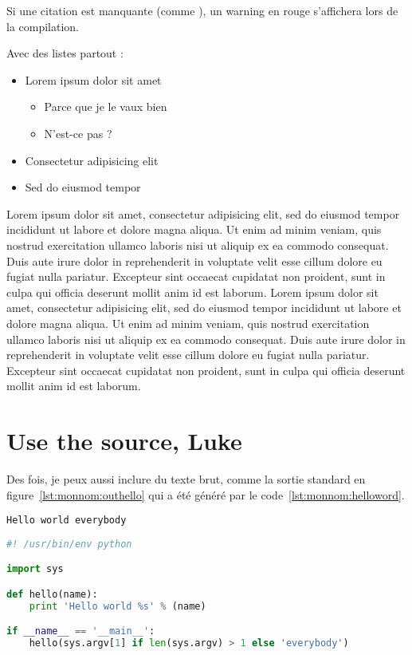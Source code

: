 Si une citation est manquante (comme \cite{monnom:referencefoireuse}),
un warning en rouge s'affichera lors de la compilation.



Avec des listes partout :
\begin{itemize}
\item Lorem ipsum dolor sit amet
  \begin{itemize}
  \item Parce que je le vaux bien
  \item N'est-ce pas ?
  \end{itemize}
\item Consectetur adipisicing elit
\item Sed do eiusmod tempor
\end{itemize}

Lorem ipsum dolor sit amet, consectetur adipisicing elit, sed do
eiusmod tempor incididunt ut labore et dolore magna aliqua. Ut enim ad
minim veniam, quis nostrud exercitation ullamco laboris nisi ut
aliquip ex ea commodo consequat. Duis aute irure dolor in
reprehenderit in voluptate velit esse cillum dolore eu fugiat nulla
pariatur. Excepteur sint occaecat cupidatat non proident, sunt in
culpa qui officia deserunt mollit anim id est laborum. Lorem ipsum
dolor sit amet, consectetur adipisicing elit, sed do eiusmod tempor
incididunt ut labore et dolore magna aliqua. Ut enim ad minim veniam,
quis nostrud exercitation ullamco laboris nisi ut aliquip ex ea
commodo consequat. Duis aute irure dolor in reprehenderit in voluptate
velit esse cillum dolore eu fugiat nulla pariatur. Excepteur sint
occaecat cupidatat non proident, sunt in culpa qui officia deserunt
mollit anim id est laborum.

\section{Use the source, Luke}


Des fois, je peux aussi inclure du texte brut, comme la sortie
standard en figure~\ref{lst:monnom:outhello} qui a été généré par le
code~\ref{lst:monnom:helloword}.

\begin{lstlisting}[language={},caption={Sortie standard},label={lst:monnom:outhello}]
Hello world everybody
\end{lstlisting}

\begin{lstlisting}[language={Python},caption={Mon premier code},label={lst:monnom:helloword}]
#! /usr/bin/env python

import sys

def hello(name):
    print 'Hello world %s' % (name)

if __name__ == '__main__':
    hello(sys.argv[1] if len(sys.argv) > 1 else 'everybody')
\end{lstlisting}

